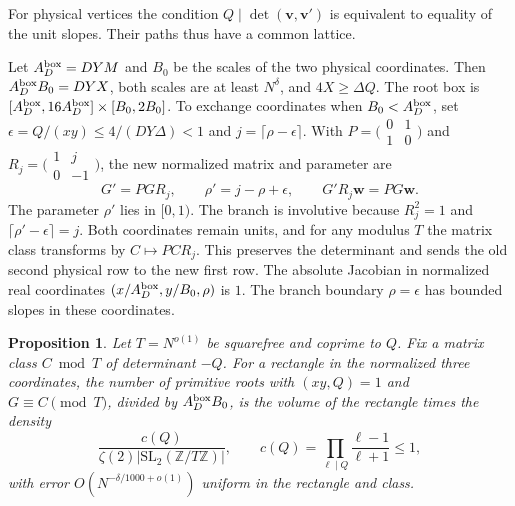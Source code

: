 \documentclass[11pt]{amsart}
\numberwithin{equation}{section}
\newtheorem{proposition}[theorem]{Proposition}
\theoremstyle{remark}
\begin{document}
For physical vertices the condition $Q\mid\det(\mathbf v,\mathbf v')$
is equivalent to equality of the unit slopes. Their paths thus have
a common lattice.

Let $A_D^{\rm box}=DYM$ and $B_0$ be the scales of the two physical
coordinates. Then $A_D^{\rm box}B_0=DYX$, both scales are at least
$N^\delta$, and $4X\geq\Delta Q$. The root box is
$[A_D^{\rm box},16A_D^{\rm box}]\times[B_0,2B_0]$.
To exchange coordinates when $B_0<A_D^{\rm box}$, set
$\epsilon=Q/(xy)\leq4/(DY\Delta)<1$ and $j=\lceil\rho-\epsilon\rceil$.
With $P=\bigl(\begin{smallmatrix}0&1\\1&0\end{smallmatrix}\bigr)$ and
$R_j=\bigl(\begin{smallmatrix}1&j\\0&-1\end{smallmatrix}\bigr)$, the
new normalized matrix and parameter are
\begin{equation}\label{eq:coordinate-swap}
 G'=PGR_j,\qquad \rho'=j-\rho+\epsilon,\qquad G'R_j\mathbf w=PG\mathbf w .
\end{equation}
The parameter $\rho'$ lies in $[0,1)$. The branch is involutive
because $R_j^2=1$ and $\lceil\rho'-\epsilon\rceil=j$. Both coordinates
remain units, and for any modulus $T$ the matrix class transforms
by $C\mapsto PCR_j$. This preserves the determinant and sends the
old second physical row to the new first row. The absolute Jacobian
in normalized real coordinates $(x/A_D^{\rm box},y/B_0,\rho)$ is
$1$. The branch boundary $\rho=\epsilon$ has bounded slopes in these
coordinates.

\begin{proposition}\label{prop:root-equidistribution}
Let $T=N^{o(1)}$ be squarefree and coprime to $Q$. Fix a matrix class
$C\bmod T$ of determinant $-Q$. For a rectangle in the normalized
three coordinates, the number of primitive roots with $(xy,Q)=1$
and $G\equiv C\pmod T$, divided by $A_D^{\rm box}B_0$, is the volume
of the rectangle times the density
\begin{equation}\label{eq:root-density}
 \frac{c(Q)}{\zeta(2)|\mathrm{SL}_2(\mathbb Z/T\mathbb Z)|},\qquad
 c(Q)=\prod_{\ell\mid Q}\frac{\ell-1}{\ell+1}\leq1,
\end{equation}
with error $O(N^{-\delta/1000+o(1)})$ uniform in the rectangle and class.
\end{proposition}
\end{document}
